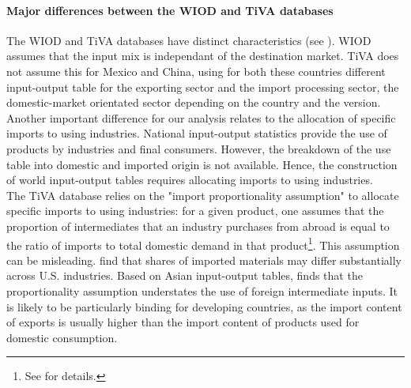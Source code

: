 \documentclass[11pt,a4paper]{article}
\begin{document}
\paragraph{Major differences between the WIOD and TiVA databases}
The WIOD and TiVA databases have distinct characteristics (see \cite{Timmer2015}). WIOD assumes that the input mix is independant of the destination market. TiVA does not assume this for Mexico and China, using for both these countries different input-output table for the exporting sector and the import processing sector, the domestic-market orientated sector  depending on the country and the version.\\
Another important difference for our analysis relates to the allocation of specific imports to using industries.
National input-output statistics provide the use of products by industries and final consumers. 
However, the breakdown of the use table into domestic and imported origin is not available. 
Hence, the construction of world input-output tables requires allocating imports to using industries.\\
The TiVA database relies on the "import proportionality assumption" to allocate specific imports to using industries: for a given product, one assumes that the proportion of intermediates that an industry purchases from abroad is equal to the ratio of imports to total domestic demand in that product\footnote{See \cite{OECD2011} for details.}. 
This assumption can be misleading. \cite{Feenstra2012} find that shares of imported materials may differ substantially across U.S. industries. Based on Asian input-output tables, \cite{Puzzello2012} finds that the proportionality assumption understates the use of foreign intermediate inputs. It is likely to be particularly binding for developing countries, as the import content of exports is usually higher than the import content of products used for domestic consumption.\\
\end{document}
